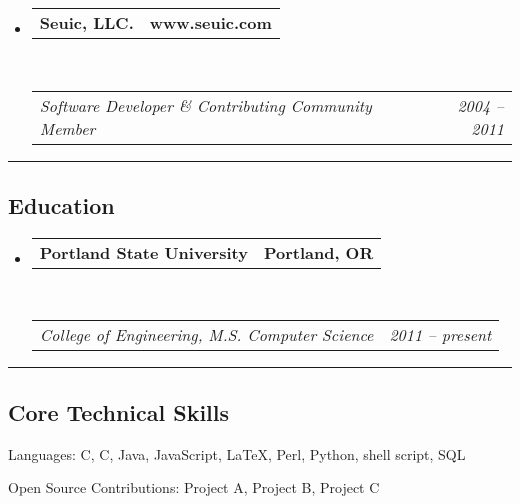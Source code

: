 \documentclass[10pt,letterpaper]{article}
\makeatletter
\newenvironment{indentsection}[1]%
{\begin{list}{}%
	{\setlength{\leftmargin}{#1}}%
	\item[]%
}
{\end{list}}
\newcommand{\headerrow}[2]
{\begin{tabular*}{\linewidth}{l@{\extracolsep{\fill}}r}
	#1 &
	#2 \\
\end{tabular*}}
\newcommand{\CPP}
{C\nolinebreak[4]\hspace{-.05em}\raisebox{.22ex}{\footnotesize\bf ++}}
\makeatother
\begin{document}
\begin{itemize}
	\item
	\headerrow
		{\textbf{Seuic, LLC.}}
		{\textbf{www.seuic.com}}
	\\
	\headerrow
		{\emph{Software Developer \& Contributing Community Member}}
		{\emph{2004 -- 2011}}

\end{itemize}


\hrule
\vspace{-0.4em}
\subsection*{Education}

\begin{itemize}
	\parskip=0.1em

	\item 
	\headerrow
		{\textbf{Portland State University}}
		{\textbf{Portland, OR}}
	\\
	\headerrow
		{\emph{College of Engineering, M.S. Computer Science}}
		{\emph{2011 -- present}}

\end{itemize}


\hrule
\vspace{-0.4em}
\subsection*{Core Technical Skills}

\begin{indentsection}{\parindent}
\begin{description*}
	\item[Languages:]
	C, \CPP, Java, JavaScript, \LaTeX, Perl, Python, shell script, SQL
	\item[Open Source Contributions:]
	Project A, Project B, Project C
\end{description*}
\end{indentsection}
\end{document}
